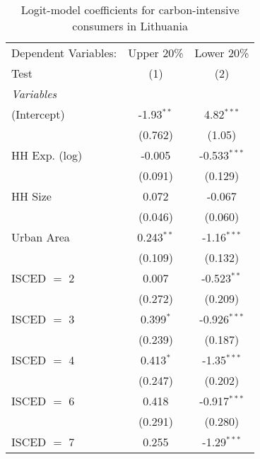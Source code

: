 
\begin{table}[htbp!]
   \centering
   \small
   \begin{adjustbox}{width = 1\textwidth, max height = 0.95\textheight, center}
      \begin{threeparttable}[b]
         \caption{\label{tab:Logit_1_LTU} Logit-model coefficients for carbon-intensive consumers in Lithuania}
         \begin{tabular}{lcc}
            \tabularnewline \midrule \midrule
            Dependent Variables: & Upper 20\%   & Lower 20\%\\   
            Test                 & (1)          & (2)\\  
            \midrule
            \emph{Variables}\\
            (Intercept)          & -1.93$^{**}$ & 4.82$^{***}$\\   
                                 & (0.762)      & (1.05)\\   
            HH Exp. (log)        & -0.005       & -0.533$^{***}$\\   
                                 & (0.091)      & (0.129)\\   
            HH Size              & 0.072        & -0.067\\   
                                 & (0.046)      & (0.060)\\   
            Urban Area           & 0.243$^{**}$ & -1.16$^{***}$\\   
                                 & (0.109)      & (0.132)\\   
            ISCED $=$ 2          & 0.007        & -0.523$^{**}$\\   
                                 & (0.272)      & (0.209)\\   
            ISCED $=$ 3          & 0.399$^{*}$  & -0.926$^{***}$\\   
                                 & (0.239)      & (0.187)\\   
            ISCED $=$ 4          & 0.413$^{*}$  & -1.35$^{***}$\\   
                                 & (0.247)      & (0.202)\\   
            ISCED $=$ 6          & 0.418        & -0.917$^{***}$\\   
                                 & (0.291)      & (0.280)\\   
            ISCED $=$ 7          & 0.255        & -1.29$^{***}$\\   

\end{tabular}
\end{threeparttable}
\end{adjustbox}
\end{table}
